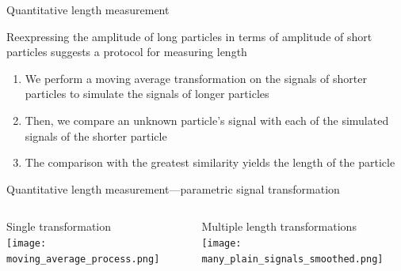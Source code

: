 \begin{frame}[c]{Quantitative length measurement}
	

	{\footnotesize
		Reexpressing the amplitude of long particles in terms of amplitude of short particles suggests a protocol for measuring length \\
		\begin{enumerate}
			\item We perform a moving average transformation on the signals of shorter particles to simulate the signals of longer particles \\
			\item Then, we compare an unknown particle's signal with each of the simulated signals of the shorter particle \\
			\item The comparison with the greatest similarity yields the length of the particle
		\end{enumerate}
	}

\end{frame}




\begin{frame}[c]{Quantitative length measurement---parametric signal transformation}
	\begin{columns}[t]
	
		\begin{column}[T]{2.25in}
			{\centering
				Single transformation \\
				\texttt{[image: moving\_average\_process.png]} \\
				\par
			}
		\end{column}
		\hfill
		\begin{column}[T]{2.25in}
			{\centering
				Multiple length transformations \\
				\texttt{[image: many\_plain\_signals\_smoothed.png]} \\
				\par
			}
		\end{column}

	\end{columns}
	


\end{frame}



